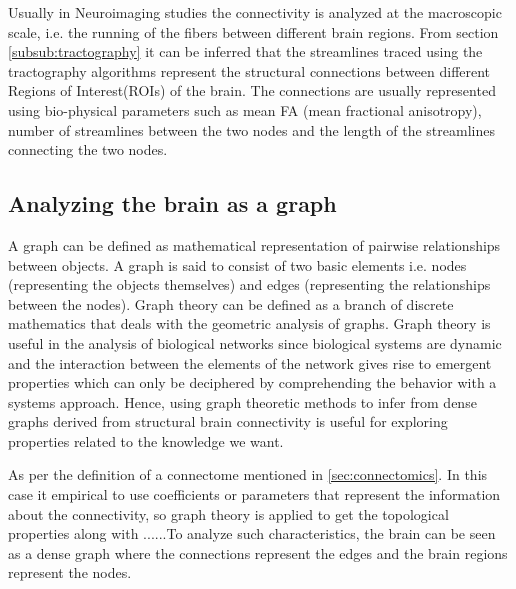 \documentclass[msthesis.tex]{subfiles}
\begin{document}
Usually in Neuroimaging studies the connectivity is analyzed at the macroscopic scale, i.e. the running of the fibers between different brain regions.  From section \ref{subsub:tractography} it can be inferred that the streamlines traced using the tractography algorithms represent the structural connections between different Regions of Interest(ROIs) of the brain. The connections are usually represented using bio-physical parameters such as mean FA (mean fractional anisotropy), number of streamlines between the two nodes and the length of the streamlines connecting the two nodes.

\subsection{Analyzing the brain as a graph}
A graph can be defined as mathematical representation of pairwise relationships between objects. A graph is said to consist of two basic elements i.e. nodes (representing the objects themselves) and edges (representing the relationships between the nodes). Graph theory can be defined as a branch of discrete mathematics that deals with the geometric analysis of graphs. Graph theory is useful in the analysis of biological networks since biological systems are dynamic and the interaction between the elements of the network gives rise to emergent properties which can only be deciphered by comprehending the behavior with a systems approach. Hence, using graph theoretic methods to infer from dense graphs derived from structural brain connectivity is useful for exploring properties related to the knowledge we want.  

As per the definition of a connectome mentioned in \ref{sec:connectomics}. In this case it empirical to use coefficients or parameters that represent the information about the connectivity, so graph theory is applied to  get the topological properties along with ......To analyze such characteristics, the brain can be seen as a dense graph where the connections represent the edges and the brain regions represent the nodes.

\end{document}

